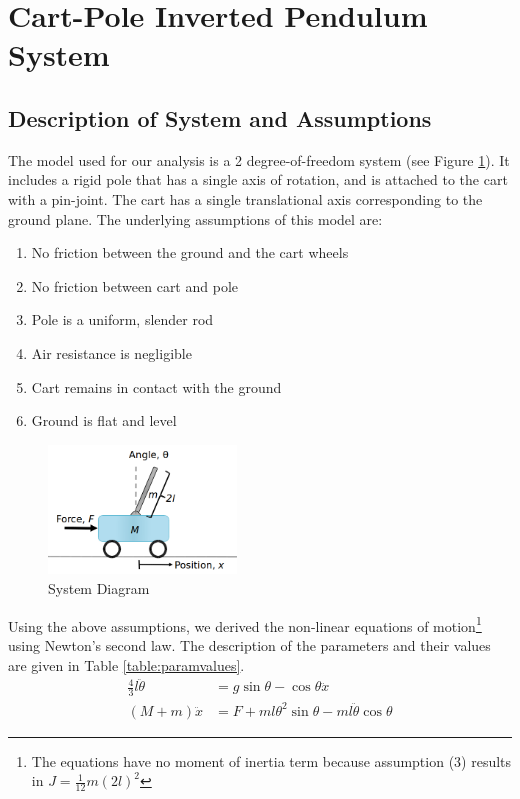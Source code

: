 \documentclass{article}
\begin{document}
\section{Cart-Pole Inverted Pendulum System}
\subsection{Description of System and Assumptions}\label{section:systemDescription}
The model used for our analysis is a 2 degree-of-freedom system (see Figure \ref{fig:sys_diagram}). It includes a rigid pole that has a single axis of rotation, and is attached to the cart with a pin-joint. The cart has a single translational axis corresponding to the ground plane. The underlying assumptions of this model are:
\begin{multicols}{2}
\begin{enumerate}
\item No friction between the ground and the cart wheels
\item No friction between cart and pole
\item Pole is a uniform, slender rod
\item Air resistance is negligible
\item Cart remains in contact with the ground
\item Ground is flat and level
\end{enumerate}
\end{multicols}
\begin{figure}[h!]
 	\centering
 	\includegraphics[width=5cm,keepaspectratio]{SystemDiagram.png}
 	\caption{System Diagram}
 	\label{fig:sys_diagram}
 \end{figure}
Using the above assumptions, we derived the non-linear equations of motion\footnote{The equations have no moment of inertia term because assumption (3) results in $J=\frac{1}{12}m(2l)^2$} using Newton's second law.  The description of the parameters and their values are given in Table \ref{table:paramvalues}.
\begin{equation}
\begin{aligned}
\frac{4}{3}l \ddot{\theta} &= g \sin \theta - \cos \theta \ddot{x} \\
(M+m)\ddot{x} &= F + ml \theta^2 \sin\theta -ml\ddot{\theta}\cos\theta
\end{aligned}
\label{eq:EOM_nonlinear}
\end{equation}
\end{document}

